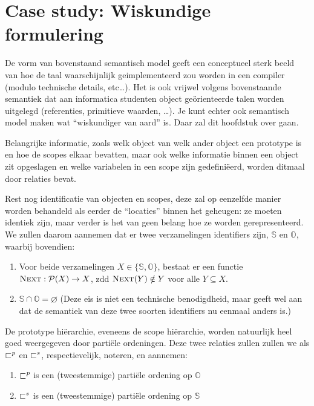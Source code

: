 
\chapter{Case study: Wiskundige formulering}

De vorm van bovenstaand semantisch model geeft een conceptueel sterk beeld van hoe de taal waarschijnlijk geimplementeerd zou worden in een compiler (modulo technische details, etc\dots). Het is ook vrijwel volgens bovenstaande semantiek dat aan informatica studenten object geörienteerde talen worden uitgelegd (referenties, primitieve waarden, \dots). Je kunt echter ook semantisch model maken wat ``wiskundiger van aard'' is. Daar zal dit hoofdstuk over gaan.

Belangrijke informatie, zoals welk object van welk ander object een prototype is en hoe de scopes elkaar bevatten, maar ook welke informatie binnen een object zit opgeslagen en welke variabelen in een scope zijn gedefiniëerd, worden ditmaal door relaties bevat.

Rest nog identificatie van objecten en scopes, deze zal op eenzelfde manier worden behandeld als eerder de ``locaties'' binnen het geheugen: ze moeten identiek zijn, maar verder is het van geen belang hoe ze worden gerepresenteerd. We zullen daarom aannemen dat er twee verzamelingen identifiers zijn, $\mathbb{S}$ en $\mathbb{O}$, waarbij bovendien:

\begin{enumerate}
	\item Voor beide verzamelingen $X \in \{\mathbb{S}, \mathbb{O}\}$, bestaat er een functie $\textsc{Next}:\mathcal{P}(X) \to X$, zdd $\textsc{Next}(Y) \notin Y$ voor alle $Y \subseteq X$.
	\item $\mathbb{S} \cap \mathbb{O} = \varnothing$ (Deze eis is niet een technische benodigdheid, maar geeft wel aan dat de semantiek van deze twee soorten identifiers nu eenmaal anders is.)
\end{enumerate}

De prototype hiërarchie, eveneens de scope hiërarchie, worden natuurlijk heel goed weergegeven door partiële ordeningen. Deze twee relaties zullen zullen we als $\sqsubset^p$ en $\sqsubset^s$, respectievelijk, noteren, en aannemen:

\begin{enumerate}
	\item $\sqsubset^p$ is een (tweestemmige) partiële ordening op $\mathbb{O}$
	\item $\sqsubset^s$ is een (tweestemmige) partiële ordening op $\mathbb{S}$
\end{enumerate}

